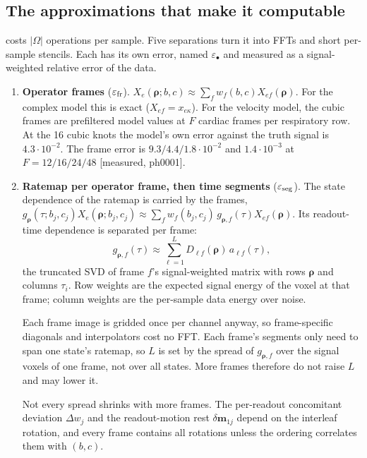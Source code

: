 \documentclass[11pt]{article}
\theoremstyle{remark}
\newcommand{\pp}{\bm\rho}
\begin{document}
\subsection{The approximations that make it computable}
\label{sec:approx}

 costs $|\Omega|$ operations per sample. Five separations turn it into FFTs and short per-sample stencils. Each has its own error, named $\varepsilon_\bullet$ and measured as a signal-weighted relative error of the data.

\begin{enumerate}
\item \textbf{Operator frames} ($\varepsilon_{\rm fr}$). $X_e(\pp;b,c)\approx\sum_fw_f(b,c)X_{ef}(\pp)$. For the complex model this is exact ($X_{ef}=x_{e\kappa}$). For the velocity model, the cubic frames are prefiltered model values at $F$ cardiac frames per respiratory row. At the 16 cubic knots the model's own error against the truth signal is $4.3\cdot10^{-2}$. The frame error is $9.3/4.4/1.8\cdot10^{-2}$ and $1.4\cdot10^{-3}$ at $F=12/16/24/48$ [measured, ph0001].
\item \textbf{Ratemap per operator frame, then time segments} ($\varepsilon_{\rm seg}$). The state dependence of the ratemap is carried by the frames, $g_{\pp}(\tau;b_j,c_j)X_e(\pp;b_j,c_j)\approx\sum_fw_f(b_j,c_j)\,g_{\pp,f}(\tau)X_{ef}(\pp)$. Its readout-time dependence is separated per frame:
\begin{equation}
g_{\pp,f}(\tau)\approx\sum_{\ell=1}^LD_{\ell f}(\pp)\,a_{\ell f}(\tau),
\label{eq:seg}
\end{equation}
the truncated SVD of frame $f$'s signal-weighted matrix with rows $\pp$ and columns $\tau_i$. Row weights are the expected signal energy of the voxel at that frame; column weights are the per-sample data energy over noise.

Each frame image is gridded once per channel anyway, so frame-specific diagonals and interpolators cost no FFT. Each frame's segments only need to span one state's ratemap, so $L$ is set by the spread of $g_{\pp,f}$ over the signal voxels of one frame, not over all states. More frames therefore do not raise $L$ and may lower it.

Not every spread shrinks with more frames. The per-readout concomitant deviation $\Delta w_j$ and the readout-motion rest $\delta\bm m_{1j}$ depend on the interleaf rotation, and every frame contains all rotations unless the ordering correlates them with $(b,c)$.


\end{enumerate}
\end{document}
